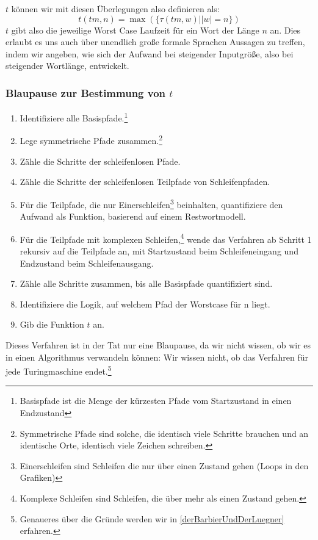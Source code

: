 $t$ können wir mit diesen Überlegungen also definieren als:
\[
t(tm, n) = \max(\{\tau(tm, w)| |w| = n\})
\]
$t$ gibt also die jeweilige Worst Case Laufzeit für ein Wort der Länge $n$ an.
Dies erlaubt es uns auch über unendlich große formale Sprachen Aussagen zu treffen,
indem wir angeben,
wie sich der Aufwand bei steigender Inputgröße,
also bei steigender Wortlänge, entwickelt.

\subsubsection{Blaupause zur Bestimmung von $t$}

\begin{enumerate}
    \item Identifiziere alle Basispfade.\footnote{%
            Basispfade ist die Menge der kürzesten Pfade vom Startzustand in einen Endzustand}
    \item Lege symmetrische Pfade zusammen.\footnote{%
            Symmetrische Pfade sind solche,
            die identisch viele Schritte brauchen und an identische Orte,
            identisch viele Zeichen schreiben.}
    \item Zähle die Schritte der schleifenlosen Pfade.
    \item Zähle die Schritte der schleifenlosen Teilpfade von Schleifenpfaden.
    \item Für die Teilpfade, die nur Einerschleifen\footnote{%
            Einerschleifen sind Schleifen die nur über einen Zustand gehen (Loops in den Grafiken)}
        beinhalten,
        quantifiziere den Aufwand als Funktion, basierend auf einem Restwortmodell.
    \item Für die Teilpfade mit komplexen Schleifen,\footnote{%
            Komplexe Schleifen sind Schleifen, die über mehr als einen Zustand gehen.}
            wende das Verfahren ab Schritt 1
        rekursiv auf die Teilpfade an, mit Startzustand beim Schleifeneingang
        und Endzustand beim Schleifenausgang.
    \item Zähle alle Schritte zusammen, bis alle Basispfade quantifiziert sind.
    \item Identifiziere die Logik, auf welchem Pfad der Worstcase für n liegt.
    \item Gib die Funktion $t$ an.
\end{enumerate}
Dieses Verfahren ist in der Tat nur eine Blaupause,
da wir nicht wissen, ob wir es in einen Algorithmus verwandeln können:
Wir wissen nicht, ob das Verfahren für jede Turingmaschine endet.\footnote{%
    Genaueres über die Gründe werden wir in \autoref{derBarbierUndDerLuegner} erfahren.}

